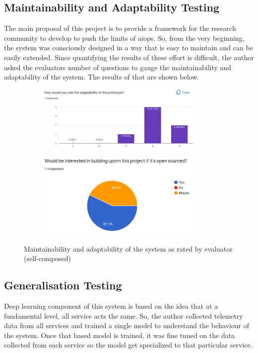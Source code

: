 \subsection{Maintainability and Adaptability Testing}

The main proposal of this project is to provide a framework for the research community to develop to push the limits of \ac{aiops}. So, from the very beginning, the system was consciously designed in a way that is easy to maintain and can be easily extended. Since quantifying the results of these effort is difficult, the author asked the evaluators number of questions to gauge the maintainability and adaptability of the system. The results of that are shown below.

\begin{figure}[H]
    \centering
    \begin{subfigure}[bH]{0.49\textwidth}
        \centering
        \includegraphics[width=8cm]{assets/testing/adaptability.png}
    \end{subfigure}
    \hfill
    \begin{subfigure}[bH]{0.49\textwidth}
        \centering
        \includegraphics[width=8cm]{assets/testing/build-uporn.png}
    \end{subfigure}
    \hfill
    \caption{Maintainability and adaptability of the system as rated by evaluator (self-composed)}
\end{figure}


\subsection{Generalisation Testing}

Deep learning component of this system is based on the idea that at a fundamental level, all service acts the same. So, the author collected telemetry data from all services and trained a single model to understand the behaviour of the system. Once that based model is trained, it was fine tuned on the data collected from each service so the model get specialized to that particular service.

